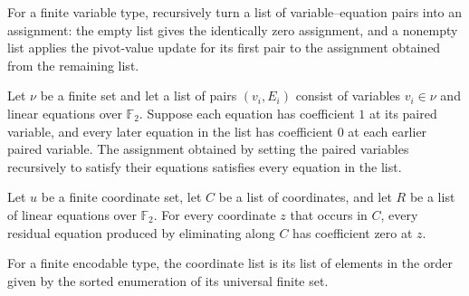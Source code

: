 \begin{definition}
\leanok
{}
For a finite variable type, recursively turn a list of variable–equation pairs into an
assignment: the empty list gives the identically zero assignment, and a nonempty list
applies the pivot-value update for its first pair to the assignment obtained from the
remaining list.
\end{definition}

\begin{theorem}
\leanok
{}
Let $\nu$ be a finite set and let a list of pairs $(v_i,E_i)$ consist of variables
$v_i\in\nu$ and linear equations over $\mathbb F_2$. Suppose each equation has
coefficient $1$ at its paired variable, and every later equation in the list has
coefficient $0$ at each earlier paired variable. The assignment obtained by setting the
paired variables recursively to satisfy their equations satisfies every equation in the
list.
\end{theorem}

\begin{theorem}
\leanok
{}
Let $
u$ be a finite coordinate set, let $C$ be a list of coordinates, and let $R$ be a list
of linear equations over $\mathbb{F}_2$. For every coordinate $z$ that occurs in $C$,
every residual equation produced by eliminating along $C$ has coefficient zero at $z$.
\end{theorem}

\begin{definition}
\leanok
For a finite encodable type, the coordinate list is its list of elements in the order
given by the sorted enumeration of its universal finite set.
\end{definition}


